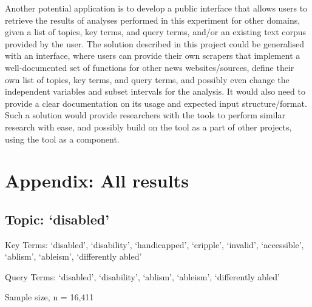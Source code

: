 \documentclass{report}
\begin{document}
Another potential application is to develop a public interface that allows users to retrieve the results of analyses performed in this experiment for other domains, given a list of topics, key terms, and query terms, and/or an existing text corpus provided by the user.
The solution described in this project could be generalised with an interface, where users can provide their own scrapers that implement a well-documented set of functions for other news websites/sources, define their own list of topics, key terms, and query terms, and possibly even change the independent variables and subset intervals for the analysis.
It would also need to provide a clear documentation on its usage and expected input structure/format.
Such a solution would provide researchers with the tools to perform similar research with ease, and possibly build on the tool as a part of other projects, using the tool as a component.

\appendix
{}  %

\printbibliography[heading=bibintoc]

\chapter{Appendix: All results}  %

\newpage
\section{Topic: `disabled'}
Key Terms: `disabled', `disability', `handicapped', `cripple', `invalid', `accessible', `ablism', `ableism', `differently abled'

\noindent Query Terms: `disabled', `disability', `ablism', `ableism', `differently abled'

\noindent Sample size, n = 16,411
\end{document}
